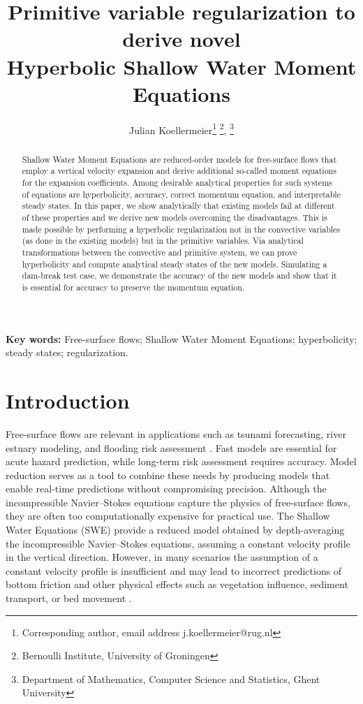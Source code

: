 \documentclass[a4paper, 11pt]{article}
\title{Primitive variable regularization to derive novel \\Hyperbolic Shallow Water Moment Equations}
\author{
Julian Koellermeier\footnote{Corresponding author, email address {j.koellermeier@rug.nl}} \footnote{Bernoulli Institute, University of Groningen},
\footnote{Department of Mathematics, Computer Science and Statistics, Ghent University}
}
\begin{document}
\maketitle
\begin{abstract}
\noindent
    Shallow Water Moment Equations are reduced-order models for free-surface flows that employ a vertical velocity expansion and derive additional so-called moment equations for the expansion coefficients. Among desirable analytical properties for such systems of equations are hyperbolicity, accuracy, correct momentum equation, and interpretable steady states.
    In this paper, we show analytically that existing models fail at different of these properties and we derive new models overcoming the disadvantages. This is made possible by performing a hyperbolic regularization not in the convective variables (as done in the existing models) but in the primitive variables. Via analytical transformations between the convective and primitive system, we can prove hyperbolicity and compute analytical steady states of the new models. Simulating a dam-break test case, we demonstrate the accuracy of the new models and show that it is essential for accuracy to preserve the momentum equation.
\end{abstract}

\noindent
{\bf Key words:} Free-surface flows; Shallow Water Moment Equations; hyperbolicity; steady states; regularization.


\section{Introduction}
\label{sec:intro}
Free-surface flows are relevant in applications such as tsunami forecasting, river estuary modeling, and flooding risk assessment \cite{Bi2015,Macias2020,Xu2024}. Fast models are essential for acute hazard prediction, while long-term risk assessment requires accuracy. Model reduction serves as a tool to combine these needs by producing models that enable real-time predictions without compromising precision. Although the incompressible Navier–Stokes equations capture the physics of free-surface flows, they are often too computationally expensive for practical use. The Shallow Water Equations (SWE) provide a reduced model obtained by depth-averaging the incompressible Navier–Stokes equations, assuming a constant velocity profile in the vertical direction. However, in many scenarios the assumption of a constant velocity profile is insufficient and may lead to incorrect predictions of bottom friction and other physical effects such as vegetation influence, sediment transport, or bed movement \cite{Garres-Diaz2021a,Huai2021}.
\end{document}
